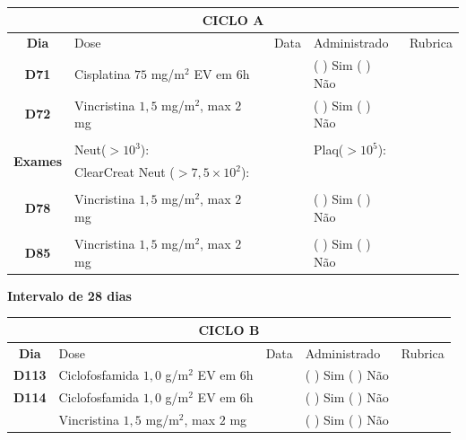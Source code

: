 \documentclass[11pt,a4paper,oldfontcommands]{memoir}
\begin{document}
\begin{center}
\begin{table}[H]
\begin{tabular}{p{1cm}p{6cm}|p{1cm}|p{3cm}|p{2.5cm}}
	\hline
	\multicolumn{5}{c}{\textbf{CICLO A}}\\
\hline
    \multicolumn{1}{c|}{\multirow{1}{*}{\textbf{Dia}}}&{Dose}&{Data}&{Administrado}&{Rubrica} \\
    \hline
    \multicolumn{1}{c|}{\multirow{1}{*}{\textbf{D71}}}&{Cisplatina \(75\) mg/m\(^2\) EV em 6h}&&{(  ) Sim (  ) Não}&\\
    \multicolumn{1}{c|}{\multirow{1}{*}{\textbf{D72}}}&{Vincristina \(1,5\) mg/m\(^2\), max \(2\) mg}&&{(  ) Sim (  ) Não}&\\
    \multicolumn{1}{c|}{\multirow{1}{*}{\textbf{}}}&&&&\\
    \hline
    \multicolumn{1}{c|}{\multirow{2}{*}{\textbf{Exames}}}&\multicolumn{2}{l|}{Neut(\(>10^3\)):}&{Plaq(\(>10^5\)):}&\\
    \cline{2-5}
    \multicolumn{1}{c|}{\multirow{2}{*}{{}}}&\multicolumn{2}{l|}{ClearCreat Neut (\(>7,5\times10^2\)):}&{}&{}\\
    \hline
    \\
    \hline
    \multicolumn{1}{c|}{\multirow{1}{*}{\textbf{D78}}}&{Vincristina \(1,5\) mg/m\(^2\), max \(2\) mg}&&{(  ) Sim (  ) Não}&\\
    \hline
    \\
    \hline
    \multicolumn{1}{c|}{\multirow{1}{*}{\textbf{D85}}}&{Vincristina \(1,5\) mg/m\(^2\), max \(2\) mg}&&{(  ) Sim (  ) Não}&\\
    \hline
    \end{tabular}
    \end{table}
    \textbf{Intervalo de 28 dias}
   \begin{table}[H]
    \begin{tabular}{p{1cm}p{6cm}|p{1cm}|p{3cm}|p{2.5cm}}
    \hline
	\multicolumn{5}{c}{\textbf{CICLO B}}\\
	\hline
    \multicolumn{1}{c|}{\multirow{1}{*}{\textbf{Dia}}}&{Dose}&{Data}&{Administrado}&{Rubrica} \\
    \hline
    \multicolumn{1}{c|}{\multirow{1}{*}{\textbf{D113}}}&{Ciclofosfamida \(1,0\) g/m\(^2\) EV em 6h}&&{(  ) Sim (  ) Não}&\\
    \multicolumn{1}{c|}{\multirow{1}{*}{\textbf{D114}}}&{Ciclofosfamida \(1,0\) g/m\(^2\) EV em 6h}&&{(  ) Sim (  ) Não}&\\
    \multicolumn{1}{c|}{\multirow{1}{*}{\textbf{}}}&{Vincristina \(1,5\) mg/m\(^2\), max \(2\) mg}&&{(  ) Sim (  ) Não}&\\

\end{tabular}
\end{table}
\end{center}
\end{document}

